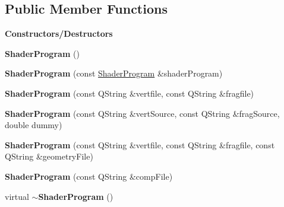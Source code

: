 \subsection*{Public Member Functions}
\begin{Indent}\textbf{ Constructors/\+Destructors}\par
\begin{DoxyCompactItemize}
\item 
\mbox{\label{classrev_1_1_shader_program_abfe751df10679c4a94544c3acd7b4b19}} 
{\bfseries Shader\+Program} ()
\item 
\mbox{\label{classrev_1_1_shader_program_a722771d542ddb41aa183999fb1251baa}} 
{\bfseries Shader\+Program} (const \mbox{\hyperlink{classrev_1_1_shader_program}{Shader\+Program}} \&shader\+Program)
\item 
\mbox{\label{classrev_1_1_shader_program_a711c9be547d9a273512b5f2f3c15d384}} 
{\bfseries Shader\+Program} (const Q\+String \&vertfile, const Q\+String \&fragfile)
\item 
\mbox{\label{classrev_1_1_shader_program_a270e918ae8a4e594257d460b638c7c44}} 
{\bfseries Shader\+Program} (const Q\+String \&vert\+Source, const Q\+String \&frag\+Source, double dummy)
\item 
\mbox{\label{classrev_1_1_shader_program_a365cb8355df4eebe3034ec8f6a523f0b}} 
{\bfseries Shader\+Program} (const Q\+String \&vertfile, const Q\+String \&fragfile, const Q\+String \&geometry\+File)
\item 
\mbox{\label{classrev_1_1_shader_program_a1b68724bd7cb29c022c7f7b595f747ca}} 
{\bfseries Shader\+Program} (const Q\+String \&comp\+File)
\item 
\mbox{\label{classrev_1_1_shader_program_a118fef10434438276fd03858d15c1083}} 
virtual {\bfseries $\sim$\+Shader\+Program} ()
\end{DoxyCompactItemize}
\end{Indent}
